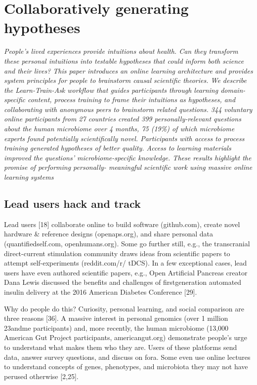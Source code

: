 

\chapter{Collaboratively generating hypotheses}

\textit{People’s lived experiences provide intuitions about health.
Can they transform these personal intuitions into testable hypotheses
that could inform both science and their lives? This
paper introduces an online learning architecture and provides
system principles for people to brainstorm causal scientific
theories. We describe the Learn-Train-Ask workflow that
guides participants through learning domain-specific content,
process training to frame their intuitions as hypotheses,
and collaborating with anonymous peers to brainstorm related
questions. 344 voluntary online participants from 27
countries created 399 personally-relevant questions about the
human microbiome over 4 months, 75 (19\%) of which microbiome
experts found potentially scientifically novel. Participants
with access to process training generated
hypotheses of better quality. Access to learning materials improved
the questions’ microbiome-specific knowledge.
These results highlight the promise of performing personally-
meaningful scientific work using massive online learning
systems}

\section{Lead users hack and track}
Lead users [18] collaborate online to build software
(github.com), create novel hardware \& reference designs
(openaps.org), and share personal data (quantifiedself.com,
openhumans.org). Some go further still, e.g., the transcranial
direct-current stimulation community draws ideas from scientific
papers to attempt self-experiments (reddit.com/r/
tDCS). In a few exceptional cases, lead users have even authored
scientific papers, e.g., Open Artificial Pancreas creator
Dana Lewis discussed the benefits and challenges of firstgeneration
automated insulin delivery at the 2016 American
Diabetes Conference [29].

Why do people do this? Curiosity, personal learning, and social
comparison are three reasons [36]. A massive interest in
personal genomics (over 1 million 23andme participants)
and, more recently, the human microbiome (13,000 American
Gut Project participants, americangut.org) demonstrate
people’s urge to understand what makes them who they are.
Users of these platforms send data, answer survey questions,
and discuss on fora. Some even use online lectures to understand
concepts of genes, phenotypes, and microbiota they
may not have perused otherwise [2,25].

